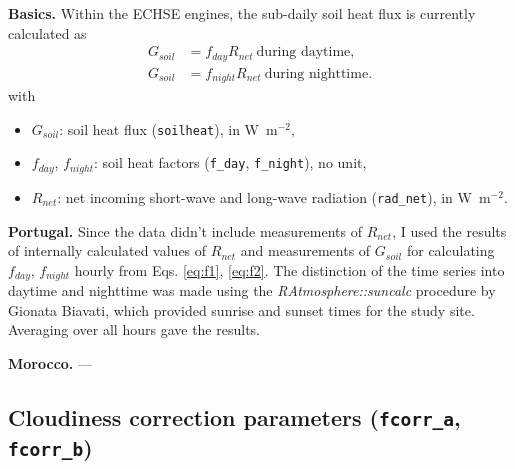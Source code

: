 \documentclass{scrreprt}
\newenvironment{denseitem}{
  \begin{itemize}
    \setlength{\itemsep}{0pt}
    \setlength{\parskip}{0pt}
    \setlength{\parsep}{0pt}
}{
  \end{itemize}
}
\begin{document}
\textbf{Basics.}
Within the ECHSE engines, the sub-daily soil heat flux is currently calculated as
\begin{align}
  G_{soil} &= f_{day} R_{net} ~ \text{during daytime}, \label{eq:f1} \\
  G_{soil} &= f_{night} R_{net} ~ \text{during nighttime}. \label{eq:f2}
\end{align}
%
with
\begin{denseitem}
  \item[] $G_{soil}$: soil heat flux (\verb!soilheat!), in W~m$^{-2}$,
  \item[] $f_{day}$, $f_{night}$: soil heat factors (\verb!f_day!, \verb!f_night!), no unit,
  \item[] $R_{net}$: net incoming short-wave and long-wave radiation (\verb!rad_net!), in W~m$^{-2}$.
\end{denseitem}

\textbf{Portugal.}
Since the data didn't include measurements of $R_{net}$, I used the results of internally calculated values of $R_{net}$ and measurements of $G_{soil}$ for calculating $f_{day}$, $f_{night}$ hourly from Eqs. \eqref{eq:f1}, \eqref{eq:f2}.
The distinction of the time series into daytime and nighttime was made using the \emph{RAtmosphere::suncalc} procedure by Gionata Biavati, which provided sunrise and sunset times for the study site.
Averaging over all hours gave the results.

\textbf{Morocco.}
---

\subsection{Cloudiness correction parameters (\texttt{fcorr\_a}, \texttt{fcorr\_b})} \label{ssec:parest_rad_fcorr}
\end{document}
